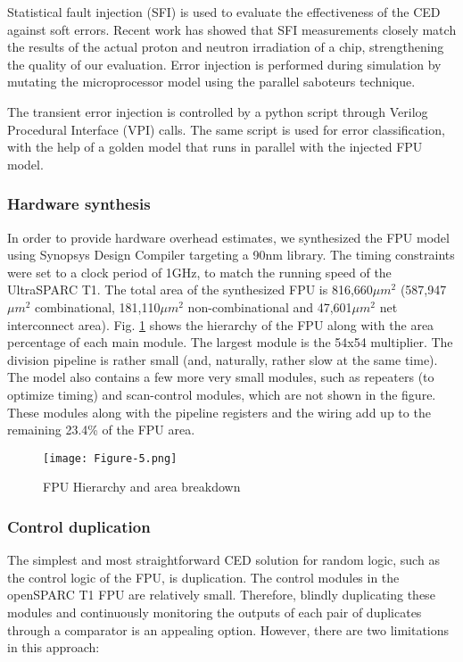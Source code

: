 \documentclass[12pt]{yalephd}
\begin{document}
Statistical fault injection (SFI) is used to evaluate the effectiveness of the CED against soft errors. Recent work \cite{sanda2008soft} has showed that SFI measurements closely match the results of the actual proton and neutron irradiation of a chip, strengthening the quality of our evaluation.  Error injection is performed during simulation by mutating the microprocessor model using the parallel saboteurs technique.

The transient error injection is controlled by a python script through Verilog Procedural Interface (VPI) calls. The same script is used for error classification, with the help of a golden model that runs in parallel with the injected FPU model.


\subsubsection{Hardware synthesis}\label{sC3sFPUGateLevel}

In order to provide hardware overhead estimates, we synthesized the FPU model using Synopsys Design Compiler targeting a 90nm library. The timing constraints were set to a clock period of 1GHz, to match the running speed of the UltraSPARC T1. The total area of the synthesized FPU is 816,660$\mu m^2$ (587,947$\mu m^2$ combinational, 181,110$\mu m^2$ non-combinational and 47,601$\mu m^2$ net interconnect area). Fig. \ref{sC3fFPUGateLevel} shows the hierarchy of the FPU along with the area percentage of each main module. The largest module is the 54x54 multiplier. The division pipeline is rather small (and, naturally, rather slow at the same time). The model also contains a few more very small modules, such as repeaters (to optimize timing) and scan-control modules, which are not shown in the figure. These modules along with the pipeline registers and the wiring add up to the remaining 23.4\% of the FPU area.

\begin{figure}[!ht]
\centering
\texttt{[image: Figure-5.png]}
\caption{FPU Hierarchy and area breakdown}\label{sC3fFPUGateLevel}
\end{figure}

\subsubsection{Control duplication}\label{sC3sCtlDupl}

The simplest and most straightforward CED solution for random logic, such as the control logic of the FPU, is duplication. The control modules in the openSPARC T1 FPU are relatively small. Therefore, blindly duplicating these modules and continuously monitoring the outputs of each pair of duplicates through a comparator is an appealing option. However, there are two limitations in this approach:
\end{document}
